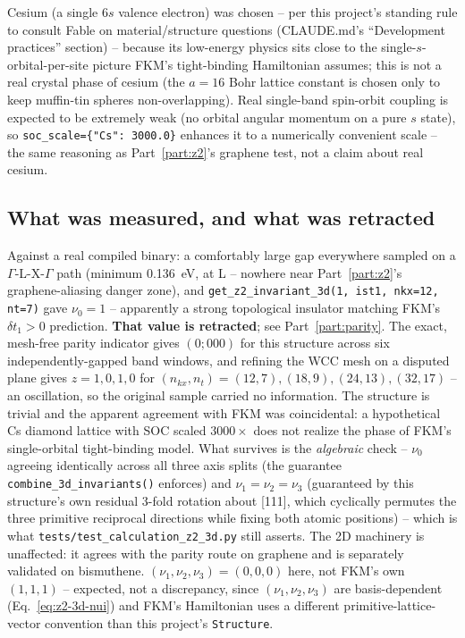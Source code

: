 \documentclass[11pt]{article}
\begin{document}
Cesium (a single 6$s$ valence electron) was chosen -- per this project's standing rule
to consult Fable on material/structure questions (CLAUDE.md's ``Development practices''
section) -- because its low-energy physics sits close to the single-$s$-orbital-per-site
picture FKM's tight-binding Hamiltonian assumes; this is not a real crystal phase of
cesium (the $a=16$ Bohr lattice constant is chosen only to keep muffin-tin spheres
non-overlapping). Real single-band spin-orbit coupling is expected to be extremely weak
(no orbital angular momentum on a pure $s$ state), so \texttt{soc\_scale=\{"Cs": 3000.0\}}
enhances it to a numerically convenient scale -- the same reasoning as
Part~\ref{part:z2}'s graphene test, not a claim about real cesium.

\subsection{What was measured, and what was retracted}

Against a real compiled binary: a comfortably large gap everywhere sampled on a
$\Gamma$-L-X-$\Gamma$ path (minimum 0.136~eV, at L -- nowhere near
Part~\ref{part:z2}'s graphene-aliasing danger zone), and
\texttt{get\_z2\_invariant\_3d(1, ist1, nkx=12, nt=7)} gave $\nu_0=1$ -- apparently a
strong topological insulator matching FKM's $\delta t_1>0$ prediction. \textbf{That
value is retracted}; see Part~\ref{part:parity}. The exact, mesh-free parity indicator
gives $(0;000)$ for this structure across six independently-gapped band windows, and
refining the WCC mesh on a disputed plane gives $z=1,0,1,0$ for
$(n_{kx},n_t)=(12,7),(18,9),(24,13),(32,17)$ -- an oscillation, so the original sample
carried no information. The structure is trivial and the apparent agreement with FKM
was coincidental: a hypothetical Cs diamond lattice with SOC scaled $3000\times$ does
not realize the phase of FKM's single-orbital tight-binding model. What survives is the
\emph{algebraic} check -- $\nu_0$ agreeing identically across all three axis splits (the
guarantee \texttt{combine\_3d\_invariants()} enforces) and $\nu_1=\nu_2=\nu_3$
(guaranteed by this structure's own residual 3-fold rotation about [111], which
cyclically permutes the three primitive reciprocal directions while fixing both atomic
positions) -- which is what
\texttt{tests/test\_calculation\_z2\_3d.py} still asserts. The 2D machinery is
unaffected: it agrees with the parity route on graphene and is separately validated on
bismuthene. $(\nu_1,\nu_2,\nu_3)=(0,0,0)$ here, not
FKM's own $(1,1,1)$ -- expected, not a discrepancy, since $(\nu_1,\nu_2,\nu_3)$ are
basis-dependent (Eq.~\eqref{eq:z2-3d-nui}) and FKM's Hamiltonian uses a different
primitive-lattice-vector convention than this project's \texttt{Structure}.
\end{document}
